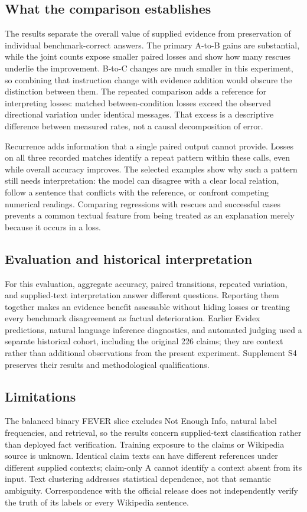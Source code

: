 \documentclass[11pt,letterpaper]{article}
\begin{document}
\subsection{What the comparison establishes}
The results separate the overall value of supplied evidence from preservation of individual benchmark-correct answers. The primary A-to-B gains are substantial, while the joint counts expose smaller paired losses and show how many rescues underlie the improvement. B-to-C changes are much smaller in this experiment, so combining that instruction change with evidence addition would obscure the distinction between them. The repeated comparison adds a reference for interpreting losses: matched between-condition losses exceed the observed directional variation under identical messages. That excess is a descriptive difference between measured rates, not a causal decomposition of error.

Recurrence adds information that a single paired output cannot provide. Losses on all three recorded matches identify a repeat pattern within these calls, even while overall accuracy improves. The selected examples show why such a pattern still needs interpretation: the model can disagree with a clear local relation, follow a sentence that conflicts with the reference, or confront competing numerical readings. Comparing regressions with rescues and successful cases prevents a common textual feature from being treated as an explanation merely because it occurs in a loss.

\subsection{Evaluation and historical interpretation}
For this evaluation, aggregate accuracy, paired transitions, repeated variation, and supplied-text interpretation answer different questions. Reporting them together makes an evidence benefit assessable without hiding losses or treating every benchmark disagreement as factual deterioration. Earlier Evidex predictions, natural language inference diagnostics, and automated judging used a separate historical cohort, including the original 226 claims; they are context rather than additional observations from the present experiment. Supplement S4 preserves their results and methodological qualifications.

\subsection{Limitations}
The balanced binary FEVER slice excludes Not Enough Info, natural label frequencies, and retrieval, so the results concern supplied-text classification rather than deployed fact verification. Training exposure to the claims or Wikipedia source is unknown. Identical claim texts can have different references under different supplied contexts; claim-only A cannot identify a context absent from its input. Text clustering addresses statistical dependence, not that semantic ambiguity. Correspondence with the official release does not independently verify the truth of its labels or every Wikipedia sentence.
\end{document}
